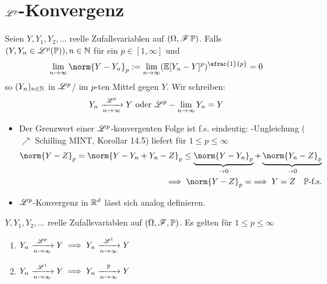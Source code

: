 ﻿\section{$\Ln{p}$-Konvergenz}
\begin{definition}[$\Ln{p}$-Konvergenz]
	Seien $Y,Y_1,Y_2, \dots$ reelle Zufallsvariablen auf $(\Omega,\mathscr F\,\mathbb{P})$. Falls $(Y,Y_n \in \mathscr{L}^{p}(\mathbb{P})), n\in \mathbb{N}$ für ein $p \in [1,\infty]$ und
	\begin{align*}
		\lim_{n \to \infty} \norm{Y-Y_n}_p := \lim_{n \to \infty} 
		(\E[Y_n - Y]^p)^{\sfrac{1}{p}} = 0
	\end{align*}
	so  $(Y_n)_{n \in \mathbb{N}}$ in $\Ln{p}$/ im $p$-ten Mittel gegen $Y$. Wir schreiben:
	\begin{align*}
		Y_n \xrightarrow[n \to \infty]{\mathscr{L}^{p}} Y \text{ oder } \mathscr{L}^{p}-\lim_{n \to \infty} Y_n = Y
	\end{align*}
\end{definition}
\begin{*remark}
	\begin{itemize}
		\item Der Grenzwert einer $\Ln{p}$-konvergenten Folge ist f.s. eindeutig: -Ungleichung ($\nearrow$ Schilling MINT, Korollar 14.5) liefert für $1 \le p \le \infty$
		\begin{align*}
			\norm{Y-Z}_p = \norm{Y-Y_n+Y_n - Z}_p \le \underbrace{\norm{Y-Y_n}_p}_{\to 0} + 
			\underbrace{\norm{Y_n-Z}_p}_{\to 0}\\
			\implies \norm{Y-Z}_p = \implies Y=Z \quad \P\text{-f.s.}
		\end{align*}
		\item $\Ln{p}$-Konvergenz in $\mathbb{R}^d$ lässt sich analog definieren.
	\end{itemize}
\end{*remark}
\begin{lemma}
	$Y,Y_1,Y_2,\dots$ reelle Zufallsvariablen auf $(\Omega,\mathscr F,\mathbb{P})$. Es gelten für $1 \le p \le \infty$
	\begin{enumerate}
		\item $Y_n \xrightarrow[n \to \infty]{\mathscr{L}^{p}} Y \implies Y_n \xrightarrow[n \to \infty]{\mathscr{L}^{1}} Y$
		\item $Y_n \xrightarrow[n \to \infty]{\mathscr{L}^{1}} Y\implies Y_n \xrightarrow[n \to \infty]{\mathbb{P}} Y$
	\end{enumerate}
\end{lemma}

